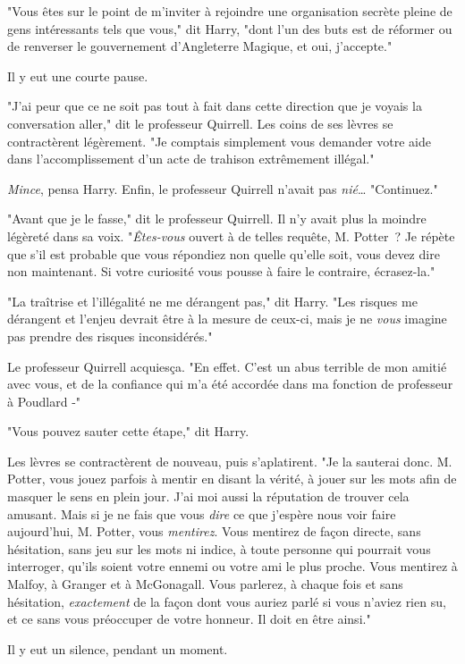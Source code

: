 "Vous êtes sur le point de m'inviter à rejoindre une organisation secrète pleine de gens intéressants tels que vous," dit Harry, "dont l'un des buts est de réformer ou de renverser le gouvernement d'Angleterre Magique, et oui, j'accepte."

Il y eut une courte pause.

"J'ai peur que ce ne soit pas tout à fait dans cette direction que je voyais la conversation aller," dit le professeur Quirrell. Les coins de ses lèvres se contractèrent légèrement. "Je comptais simplement vous demander votre aide dans l'accomplissement d'un acte de trahison extrêmement illégal."

\emph{Mince}, pensa Harry. Enfin, le professeur Quirrell n'avait pas \emph{nié}… "Continuez."

"Avant que je le fasse," dit le professeur Quirrell. Il n'y avait plus la moindre légèreté dans sa voix. "\emph{Êtes-vous} ouvert à de telles requête, M. Potter~? Je répète que s'il est probable que vous répondiez non quelle qu'elle soit, vous devez dire non maintenant. Si votre curiosité vous pousse à faire le contraire, écrasez-la."

"La traîtrise et l'illégalité ne me dérangent pas," dit Harry. "Les risques me dérangent et l'enjeu devrait être à la mesure de ceux-ci, mais je ne \emph{vous} imagine pas prendre des risques inconsidérés."

Le professeur Quirrell acquiesça. "En effet. C'est un abus terrible de mon amitié avec vous, et de la confiance qui m'a été accordée dans ma fonction de professeur à Poudlard -"

"Vous pouvez sauter cette étape," dit Harry.

Les lèvres se contractèrent de nouveau, puis s'aplatirent. "Je la sauterai donc. M. Potter, vous jouez parfois à mentir en disant la vérité, à jouer sur les mots afin de masquer le sens en plein jour. J'ai moi aussi la réputation de trouver cela amusant. Mais si je ne fais que vous \emph{dire} ce que j'espère nous voir faire aujourd'hui, M. Potter, vous \emph{mentirez}. Vous mentirez de façon directe, sans hésitation, sans jeu sur les mots ni indice, à toute personne qui pourrait vous interroger, qu'ils soient votre ennemi ou votre ami le plus proche. Vous mentirez à Malfoy, à Granger et à McGonagall. Vous parlerez, à chaque fois et sans hésitation, \emph{exactement} de la façon dont vous auriez parlé si vous n'aviez rien su, et ce sans vous préoccuper de votre honneur. Il doit en être ainsi."

Il y eut un silence, pendant un moment.

